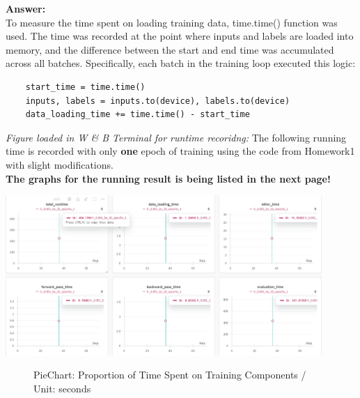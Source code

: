 \documentclass[11pt, oneside]{article}   	%
\begin{document}
\textbf{Answer:}
\\
To measure the time spent on loading training data, time.time() function was used. The time was recorded at the point where inputs and labels are loaded into memory, and the difference between the start and end time was accumulated across all batches. Specifically, each batch in the training loop executed this logic:
\begin{lstlisting}
    start_time = time.time()
    inputs, labels = inputs.to(device), labels.to(device)
    data_loading_time += time.time() - start_time
\end{lstlisting}

\textit{Figure loaded in W \& B Terminal for runtime recoridng: }
The following running time is recorded with only \textbf{one} epoch of training using the code from Homework1 with slight modifications.
\\
\textbf{The graphs for the running result is being listed in the next page!}

\begin{center}
    \includegraphics[width=0.9\textwidth]{graphs/Figure_2.png}
\end{center}

\begin{figure}[ht]
    \centering
    \caption{PieChart: Proportion of Time Spent on Training Components / Unit: seconds}
    \label{fig:time_pie_chart}
\end{figure}
\end{document}
